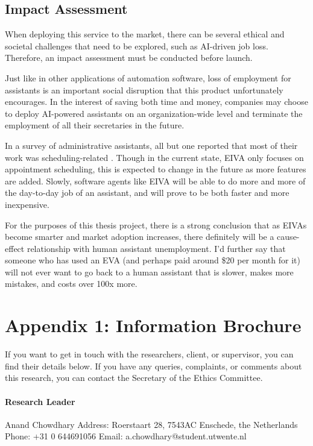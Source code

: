 \documentclass{article}
\begin{document}
\subsection{Impact Assessment}

When deploying this service to the market, there can be several ethical and societal challenges that need to be explored, such as AI-driven job loss. Therefore, an impact assessment must be conducted before launch.

Just like in other applications of automation software, loss of employment for assistants is an important social disruption that this product unfortunately encourages. In the interest of saving both time and money, companies may choose to deploy AI-powered assistants on an organization-wide level and terminate the employment of all their secretaries in the future.

In a survey of administrative assistants, all but one reported that most of their work was scheduling-related \cite{erickson_assistance:_2008}. Though in the current state, EIVA only focuses on appointment scheduling, this is expected to change in the future as more features are added. Slowly, software agents like EIVA will be able to do more and more of the day-to-day job of an assistant, and will prove to be both faster and more inexpensive.

For the purposes of this thesis project, there is a strong conclusion that as EIVAs become smarter and market adoption increases, there definitely will be a cause-effect relationship with human assistant unemployment. I'd further say that someone who has used an EVA (and perhaps paid around \$20 per month for it) will not ever want to go back to a human assistant that is slower, makes more mistakes, and costs over 100x more.

\newpage

\cleardoublepage
{}
\setcounter{page}{\thesavepage}

\section*{Appendix 1: Information Brochure}

If you want to get in touch with the researchers, client, or supervisor, you can find their details below. If you have any queries, complaints, or comments about this research, you can contact the Secretary of the Ethics Committee.

\paragraph{Research Leader}
Anand Chowdhary\newline
Address: Roerstaart 28, 7543AC Enschede, the Netherlands\newline
Phone: +31 0 644691056\newline
Email: a.chowdhary@student.utwente.nl
\end{document}
